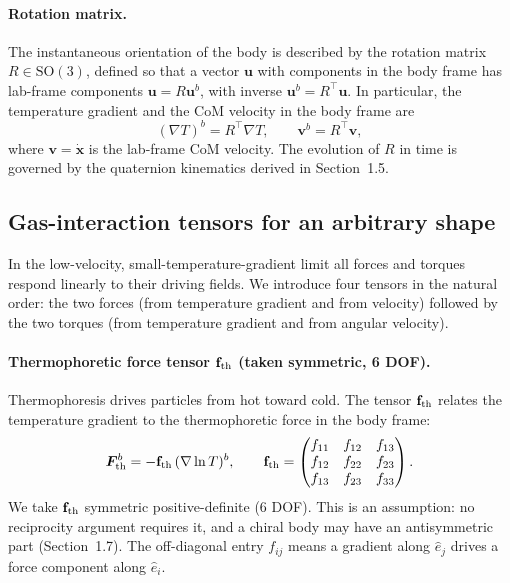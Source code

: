 \documentclass[11pt]{article}
\newcommand{\chg}[1]{\marginpar{\raggedright\footnotesize\textcolor{red!70!black}{\textsf{#1}}}}
\newcommand{\vect}[1]{\bm{#1}}
\newcommand{\T}{^{\!\top}}
\begin{document}
\paragraph{Rotation matrix.} The instantaneous orientation of the body is described by the rotation matrix $R\in\mathrm{SO}(3)$, defined so that a vector $\vect u$ with components in the body frame has lab-frame components $\vect u=R\vect u^b$, with inverse $\vect u^b=R\T\vect u$. In particular, the temperature gradient and the CoM velocity in the body frame are
\begin{equation}
  (\nabla T)^b = R\T\nabla T, \qquad \vect v^b = R\T\vect v,
\end{equation}
where $\vect v=\dot{\vect x}$ is the lab-frame CoM velocity. The evolution of $R$ in time is governed by the quaternion kinematics derived in Section~1.5.

\subsection{Gas-interaction tensors for an arbitrary shape}
In the low-velocity, small-temperature-gradient limit all forces and torques respond linearly to their driving fields. We introduce four tensors in the natural order: the two forces (from temperature gradient and from velocity) followed by the two torques (from temperature gradient and from angular velocity).

\paragraph{Thermophoretic force tensor $\mathbf f_{\rm th}$ (taken symmetric, 6 DOF).}\chg{C2} Thermophoresis drives particles from hot toward cold. The tensor $\mathbf f_{\rm th}$ relates the temperature gradient to the thermophoretic force in the body frame:
\begin{equation}
  \vect F^b_{\rm th} = -\mathbf f_{\rm th}\,(\nabla\ln T)^b, \qquad
  \mathbf f_{\rm th} = \begin{pmatrix} f_{11} & f_{12} & f_{13}\\ f_{12} & f_{22} & f_{23}\\ f_{13} & f_{23} & f_{33}\end{pmatrix}.
\end{equation}
We take $\mathbf f_{\rm th}$ symmetric positive-definite (6 DOF). This is an assumption: no reciprocity argument requires it, and a chiral body may have an antisymmetric part (Section~1.7). The off-diagonal entry $f_{ij}$ means a gradient along $\hat e_j$ drives a force component along $\hat e_i$.
\end{document}
